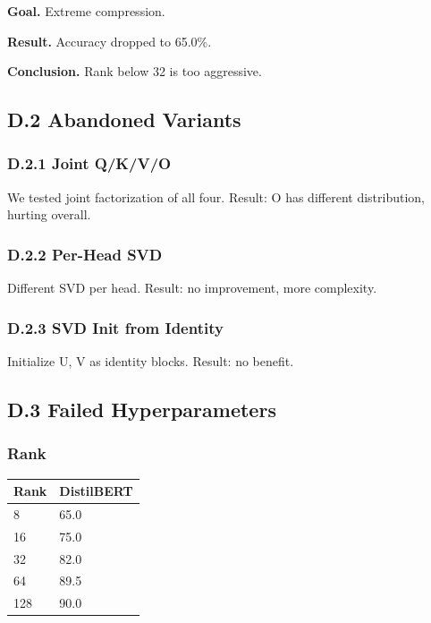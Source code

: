 \textbf{Goal.} Extreme compression.

\textbf{Result.} Accuracy dropped to 65.0\%.

\textbf{Conclusion.} Rank below 32 is too aggressive.

\subsection{D.2 Abandoned Variants}

\subsubsection{D.2.1 Joint Q/K/V/O}

We tested joint factorization of all four. Result: O has different 
distribution, hurting overall.

\subsubsection{D.2.2 Per-Head SVD}

Different SVD per head. Result: no improvement, more complexity.

\subsubsection{D.2.3 SVD Init from Identity}

Initialize U, V as identity blocks. Result: no benefit.

\subsection{D.3 Failed Hyperparameters}

\subsubsection{Rank}

\begin{table}[H]
\centering
\small
\begin{tabular}{ll}
\toprule
\textbf{Rank} & \textbf{DistilBERT} \\
\midrule
8 & 65.0 \\
16 & 75.0 \\
32 & 82.0 \\
64 & 89.5 \\
128 & 90.0 \\
\bottomrule
\end{tabular}
\end{table}

